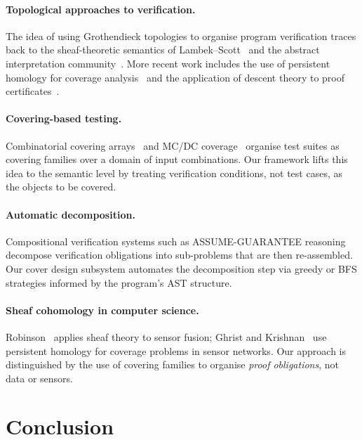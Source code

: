 \documentclass[11pt]{article}
\begin{document}
\paragraph{Topological approaches to verification.}
The idea of using Grothendieck topologies to organise program
verification traces back to the sheaf-theoretic semantics of
Lambek–Scott~\cite{lambek1986} and the abstract interpretation
community~\cite{cousot1977}.
More recent work includes the use of persistent homology for
coverage analysis~\cite{paper16} and the application of descent theory
to proof certificates~\cite{paper03}.

\paragraph{Covering-based testing.}
Combinatorial covering arrays~\cite{kuhn2013} and MC/DC
coverage~\cite{hayhurst2001} organise test suites as covering
families over a domain of input combinations.
Our framework lifts this idea to the semantic level by treating
verification conditions, not test cases, as the objects to be covered.

\paragraph{Automatic decomposition.}
Compositional verification systems such as ASSUME-GUARANTEE
reasoning~\cite{pasareanu2008} decompose verification obligations into
sub-problems that are then re-assembled.
Our cover design subsystem automates the decomposition step via
greedy or BFS strategies informed by the program's AST structure.

\paragraph{Sheaf cohomology in computer science.}
Robinson~\cite{robinson2014} applies sheaf theory to sensor fusion;
Ghrist and Krishnan~\cite{ghrist2008} use persistent homology for
coverage problems in sensor networks.
Our approach is distinguished by the use of covering families to
organise \emph{proof obligations}, not data or sensors.

\section{Conclusion}\label{sec:conclusion}
\end{document}
